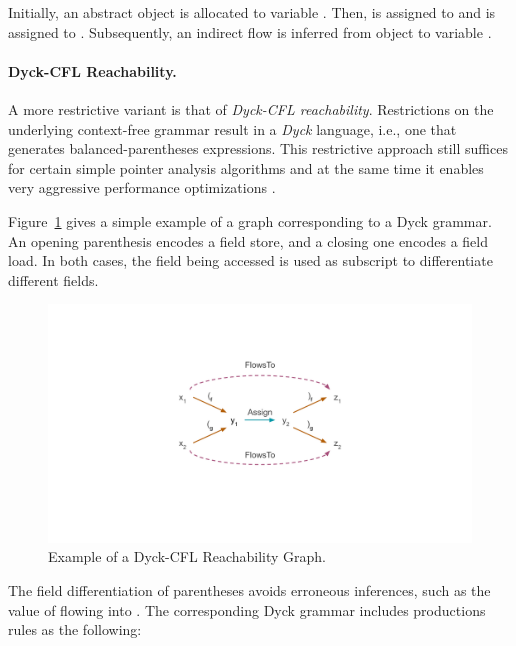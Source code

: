 Initially, an abstract object  is allocated to variable . Then,  is assigned to  and  is assigned to . Subsequently, an indirect flow is inferred from object  to variable .


\paragraph{Dyck-CFL Reachability.}
A more restrictive variant is that of \emph{Dyck-CFL reachability}. Restrictions on the underlying context-free grammar result in a \emph{Dyck} language, i.e., one that generates balanced-parentheses expressions. This restrictive approach still suffices for certain simple pointer analysis algorithms and at the same time it enables very aggressive performance optimizations \todo{}.

Figure~\ref{fig:related:dyck-cfl} gives a simple example of a graph corresponding to a Dyck grammar. An opening parenthesis encodes a field store, and a closing one encodes a field load. In both cases, the field being accessed is used as subscript to differentiate different fields.

\begin{figure}[ht]
\centering
\includegraphics[trim={40mm 40mm 40mm 30mm},clip,width=1\linewidth]{assets/related/DyckCFL.pdf}
\caption[Example of a Dyck-CFL-Reachability Graph]{Example of a Dyck-CFL Reachability Graph.}
\label{fig:related:dyck-cfl}
\end{figure}

The field differentiation of parentheses avoids erroneous inferences, such as the value of  flowing into . The corresponding Dyck grammar includes productions rules as the following:

